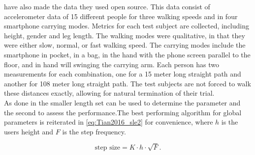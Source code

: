 \citet{Vezocnik2019} have also made the data they used open source. This data consist of accelerometer data of 15 different people for three walking speeds and in four smartphone carrying modes. Metrics for each test subject are collected, including height, gender and leg length. The walking modes were qualitative, in that they were either slow, normal, or fast walking speed. The carrying modes include the smartphone in pocket, in a bag, in the hand with the phone screen parallel to the floor, and in hand will swinging the carrying arm. Each person has two measurements for each combination, one for a 15 meter long straight path and another for 108 meter long straight path. The test subjects are not forced to walk these distances exactly, allowing for natural termination of their trial. \\
As done in \cite{Vezocnik2019} the smaller length set can be used to determine the parameter and the second to assess the performance.The best performing algorithm for global parameters is reiterated in \cref{eq:Tian2016_sle2} for convenience, where $h$ is the users height and $F$ is the step frequency. 

\begin{equation}
\label{eq:Tian2016_sle2}
\text{step size} = K \cdot h \cdot \sqrt{F}.
\end{equation}

